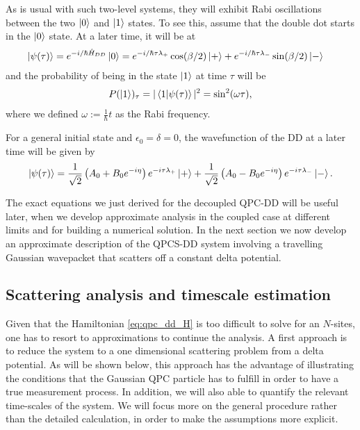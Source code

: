 \documentclass{article}
\begin{document}
As is usual with such two-level systems, they will exhibit Rabi oscillations between the two $\ket{0}$ and
$\ket{1}$ states. To see this, assume that the double dot starts in the $\ket{0}$ state. At 
a later time, it will be at 
\begin{align*}
    \ket{\psi (\tau)} = e^{-i/\hbar \hat{H}_{DD}}\ket{0} & = 
        e^{-i/\hbar \tau\lambda_{+}}\cos (\beta/2) \ket{+} + 
        e^{-i/\hbar \tau \lambda_{-}}\sin(\beta/2) \ket{-} 
\end{align*}
and the probability of being in the state $\ket{1}$ at time $\tau$ will be
\begin{align}
    P(\ket{1})_\tau = |\bra{1}\ket{\psi(\tau)}|^2 = \sin^2(\omega\tau),
\end{align}
where we defined $\omega := \frac{1}{\hbar}t$ as the Rabi frequency.

For a general initial state and $\epsilon_0 = \delta = 0$, the wavefunction of the DD at a 
later time will be given by 
\begin{align}\label{eq:DD_wave_general}
    \ket{\psi (\tau)} = \frac{1}{\sqrt{2}}\left( A_0  +B_0 e^{-i\eta} 
    \right) e^{-i\tau \lambda_+} \ket{+} + 
    \frac{1}{\sqrt{2}}\left( A_0  -B_0 e^{-i\eta} 
    \right)  e^{-i\tau \lambda_-} \ket{-}.
\end{align}

The exact equations we just derived for the decoupled QPC-DD will be useful later, when we develop
approximate analysis in the coupled case at different limits and for building a numerical solution.
In the next section we now develop an approximate description of the QPCS-DD system involving a travelling
Gaussian wavepacket that scatters off a constant delta potential.   

\subsection{Scattering analysis and timescale estimation}\label{sect:scattering}

Given that the Hamiltonian \eqref{eq:qpc_dd_H} is too difficult to solve for an $N$-sites, one has to resort to approximations to continue the analysis. A first approach is to reduce the system to a one dimensional scattering problem from a delta potential.
As will be shown below, this approach has the advantage of illustrating the conditions that the 
Gaussian QPC particle has to fulfill in order to have a true measurement process. In addition, 
we will also able to quantify the relevant time-scales of the system. 
We will focus more on the general procedure rather than the detailed calculation, 
in order to make the assumptions more explicit.
\end{document}
